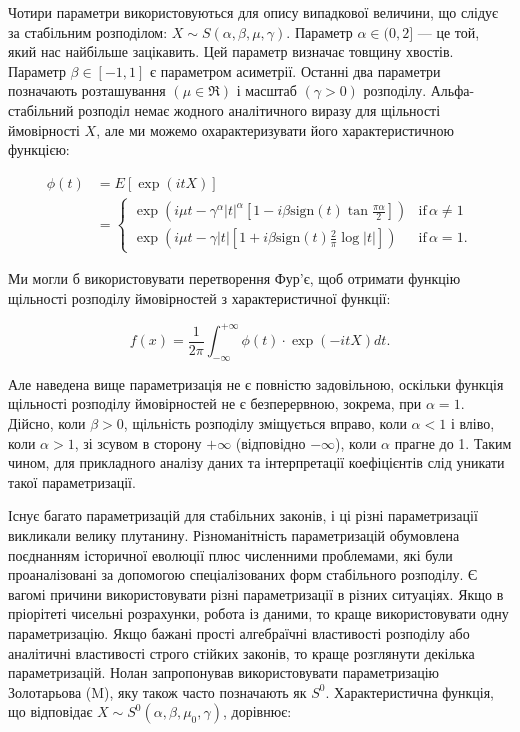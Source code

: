 \documentclass[
  letterpaper,
]{report}
\begin{document}
Чотири параметри використовуються для опису випадкової величини, що
слідує за стабільним розподілом:
\(X \sim S(\alpha, \beta, \mu, \gamma)\). Параметр \(\alpha \in (0, 2]\)
--- це той, який нас найбільше зацікавить. Цей параметр визначає товщину
хвостів. Параметр \(\beta \in [-1, 1]\) є параметром асиметрії. Останні
два параметри позначають розташування \((\mu \in \Re)\) і масштаб
\((\gamma > 0)\) розподілу. Альфа-стабільний розподіл немає жодного
аналітичного виразу для щільності ймовірності \(X\), але ми можемо
охарактеризувати його характеристичною функцією:

\[
    \begin{split}
    \phi(t) &= E\left[\exp(itX)\right] \\
            &= 
        \begin{cases} 
            \exp\left(i \mu t - \gamma^{\alpha}|t|^{\alpha} \left[1-i\beta\text{sign}(t)\tan{\frac{\pi\alpha}{2}}\right]\right) & \text{if} \, \alpha \neq 1 \\ \exp\left(i \mu t - \gamma|t| \left[1+i\beta\text{sign}(t)\frac{2}{\pi}\log{|t|}\right]\right) & \text{if} \, \alpha = 1. 
        \end{cases} 
    \end{split}
\]

Ми могли б використовувати перетворення Фур'є, щоб отримати функцію
щільності розподілу ймовірностей з характеристичної функції:

\[ 
f(x) = \frac{1}{2\pi}\int_{-\infty}^{+\infty} \phi(t) \cdot \exp(-itX) dt. 
\]

Але наведена вище параметризація не є повністю задовільною, оскільки
функція щільності розподілу ймовірностей не є безперервною, зокрема, при
\(\alpha = 1\). Дійсно, коли \(\beta > 0\), щільність розподілу
зміщується вправо, коли \(\alpha < 1\) і вліво, коли \(\alpha > 1\), зі
зсувом в сторону \(+\infty\) (відповідно \(-\infty\)), коли \(\alpha\)
прагне до 1. Таким чином, для прикладного аналізу даних та інтерпретації
коефіцієнтів слід уникати такої параметризації.

Існує багато параметризацій для стабільних законів, і ці різні
параметризації викликали велику плутанину. Різноманітність
параметризацій обумовлена поєднанням історичної еволюції плюс численними
проблемами, які були проаналізовані за допомогою спеціалізованих форм
стабільного розподілу. Є вагомі причини використовувати різні
параметризації в різних ситуаціях. Якщо в пріорітеті чисельні
розрахунки, робота із даними, то краще використовувати одну
параметризацію. Якщо бажані прості алгебраїчні властивості розподілу або
аналітичні властивості строго стійких законів, то краще розглянути
декілька параметризацій. Нолан запропонував використовувати
параметризацію Золотарьова (M), яку також часто позначають як \(S^{0}\).
Характеристична функція, що відповідає
\(X \sim S^{0}(\alpha, \beta, \mu_{0}, \gamma)\), дорівнює:
\end{document}
